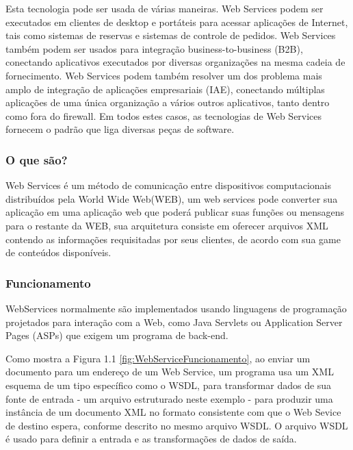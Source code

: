 \documentclass{acm_proc_article-sp}
\begin{document}
		Esta tecnologia pode ser usada de várias maneiras. Web Services podem ser executados em clientes de desktop e portáteis para acessar aplicações de Internet, tais como sistemas de reservas e sistemas de controle de pedidos. Web Services também podem ser usados para integração business-to-business (B2B), conectando aplicativos executados por diversas organizações na mesma cadeia de fornecimento. Web Services podem também resolver um dos problema mais amplo de integração de aplicações empresariais (IAE), conectando múltiplas aplicações de uma única organização a vários outros aplicativos, tanto dentro como fora do firewall. Em todos estes casos, as tecnologias de Web Services fornecem o padrão que liga diversas peças de software.\cite{UNDERWEBSERVICES}
		
		\subsubsection{O que são?}
			Web Services é um método de comunicação entre dispositivos computacionais distribuídos pela World Wide Web(WEB), um web services pode converter sua aplicação em uma aplicação web que poderá publicar suas funções ou mensagens para o restante da WEB, sua arquitetura consiste em oferecer arquivos XML contendo as informações requisitadas por seus clientes, de acordo com sua game de conteúdos disponíveis.\cite{WEBS}
		
		\subsubsection{Funcionamento}
		
			WebServices normalmente são implementados usando linguagens de programação projetados para interação com a Web, como Java Servlets ou Application Server Pages (ASPs) que exigem um programa de back-end.
		
			Como mostra a Figura 1.1 \ref{fig:WebServiceFuncionamento}, ao enviar um documento para um endereço de um Web Service, um programa usa um XML esquema de um tipo específico como o WSDL, para transformar dados de sua fonte de entrada - um arquivo estruturado neste exemplo - para produzir uma instância de um documento XML no formato consistente com que o Web Sevice de destino espera, conforme descrito no mesmo arquivo WSDL. O arquivo WSDL é usado para definir a entrada e as transformações de dados de saída.
		
\end{document}
